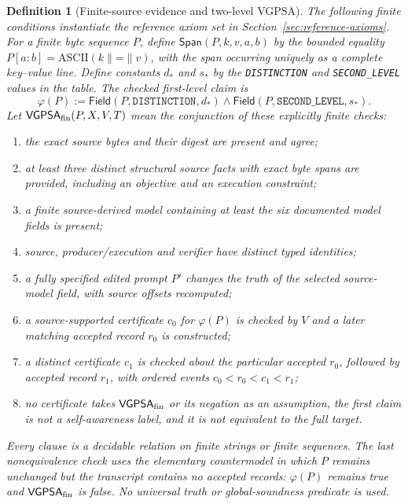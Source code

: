\documentclass[11pt]{article}
\newtheorem{definition}{Definition}[section]
\theoremstyle{remark}
\begin{document}
\begin{definition}[Finite-source evidence and two-level VGPSA]
The following finite conditions instantiate the reference axiom set in Section~\ref{sec:reference-axioms}. For a finite byte sequence $P$, define $\mathsf{Span}(P,k,v,a,b)$ by the bounded equality $P[a{:}b]=\mathrm{ASCII}(k\mathbin{\|}\texttt{=}\mathbin{\|}v)$, with the span occurring uniquely as a complete key--value line. Define constants $d_*$ and $s_*$ by the \texttt{DISTINCTION} and \texttt{SECOND\_LEVEL} values in the table. The checked first-level claim is
\[
\varphi(P):=\mathsf{Field}(P,\texttt{DISTINCTION},d_*)\wedge
\mathsf{Field}(P,\texttt{SECOND\_LEVEL},s_*).
\]
Let $\mathsf{VGPSA}_{\rm fin}(P,X,V,T)$ mean the conjunction of these explicitly finite checks:
\begin{enumerate}[label=\textbf{SA\arabic*},leftmargin=*,itemsep=2pt]
\item the exact source bytes and their digest are present and agree;
\item at least three distinct structural source facts with exact byte spans are provided, including an objective and an execution constraint;
\item a finite source-derived model containing at least the six documented model fields is present;
\item source, producer/execution and verifier have distinct typed identities;
\item a fully specified edited prompt $P'$ changes the truth of the selected source-model field, with source offsets recomputed;
\item a source-supported certificate $c_0$ for $\varphi(P)$ is checked by $V$ and a later matching accepted record $r_0$ is constructed;
\item a distinct certificate $c_1$ is checked about the \emph{particular} accepted $r_0$, followed by accepted record $r_1$, with ordered events $c_0<r_0<c_1<r_1$;
\item no certificate takes $\mathsf{VGPSA}_{\rm fin}$ or its negation as an assumption, the first claim is not a self-awareness label, and it is not equivalent to the full target.
\end{enumerate}
Every clause is a decidable relation on finite strings or finite sequences. The last nonequivalence check uses the elementary countermodel in which $P$ remains unchanged but the transcript contains no accepted records: $\varphi(P)$ remains true and $\mathsf{VGPSA}_{\rm fin}$ is false. No universal truth or global-soundness predicate is used.
\end{definition}
\end{document}

